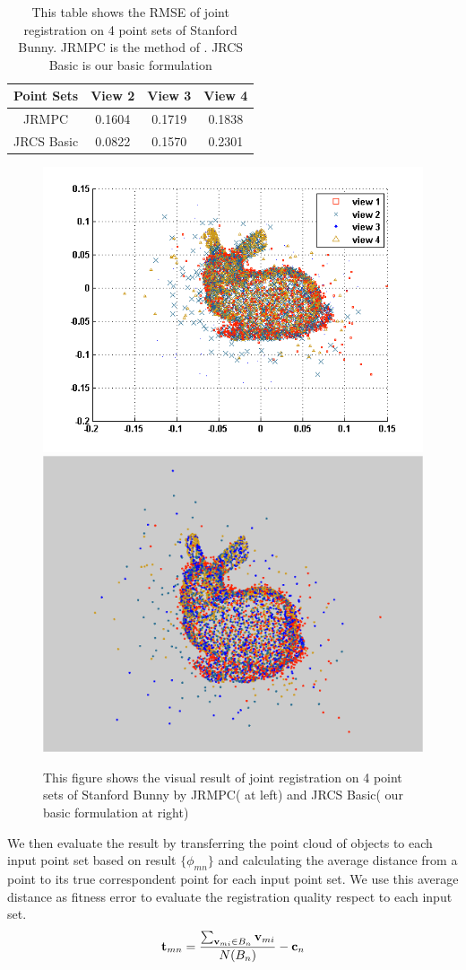 \begin{table}
	\centering
	\caption{This table shows the RMSE of joint registration on 4 point sets of Stanford Bunny. JRMPC is the method of \cite{Evangelidis2014}. JRCS Basic is our basic formulation}
	\begin{tabular}{c c c c}
		Point Sets& View 2 & View 3 & View 4 \\
		\hline
		JRMPC & 0.1604 & 0.1719 & 0.1838\\   
		JRCS Basic & 0.0822 &  0.1570  & 0.2301\\
	\end{tabular}
	\label{tab:reg}
\end{table}
\begin{figure}[htb]
	\centering
	\includegraphics[width=0.4\linewidth]{images/JRMPC.png}
	\includegraphics[width=0.4\linewidth]{images/JRCSReg.png}
	\caption{This figure shows the visual result of joint registration on 4 point sets of Stanford Bunny by JRMPC(\cite{Evangelidis2014} at left) and JRCS Basic( our basic formulation at right) }
	\label{fig:reg}
\end{figure}
We then evaluate the result by transferring the point cloud of objects to each input point set based on result $\{\phi_{mn}\}$ and calculating the average distance from a point to its true correspondent point for each input point set.
We use this average distance as fitness error to evaluate the registration quality respect to each input set.
\begin{equation}
	\label{equ:error}
	\mathbf{t}_{mn}=\frac{\sum_{\mathbf{v}_{mi} \in B_n}\mathbf{v}_{mi}}{N(B_n)}-\mathbf{c}_n
\end{equation}

